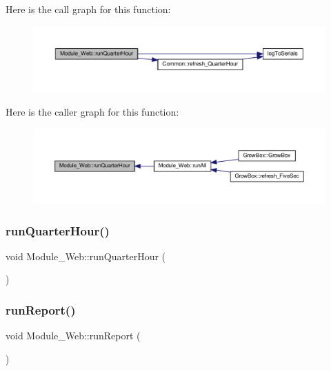 Here is the call graph for this function\+:
\nopagebreak
\begin{figure}[H]
\begin{center}
\leavevmode
\includegraphics[width=350pt]{class_module___web_a89d99a5091a144203cc705deda0c0426_cgraph}
\end{center}
\end{figure}
Here is the caller graph for this function\+:
\nopagebreak
\begin{figure}[H]
\begin{center}
\leavevmode
\includegraphics[width=350pt]{class_module___web_a89d99a5091a144203cc705deda0c0426_icgraph}
\end{center}
\end{figure}
\mbox{\label{class_module___web_a89d99a5091a144203cc705deda0c0426}} 
\subsubsection{\texorpdfstring{run\+Quarter\+Hour()}{runQuarterHour()}\hspace{0.1cm}{\footnotesize\ttfamily [2/2]}}
{\footnotesize\ttfamily void Module\+\_\+\+Web\+::run\+Quarter\+Hour (\begin{DoxyParamCaption}{ }\end{DoxyParamCaption})}

\mbox{\label{class_module___web_a32622fc4e87a9885319c73c5b4802cc5}} 
\subsubsection{\texorpdfstring{run\+Report()}{runReport()}\hspace{0.1cm}{\footnotesize\ttfamily [1/2]}}
{\footnotesize\ttfamily void Module\+\_\+\+Web\+::run\+Report (\begin{DoxyParamCaption}{ }\end{DoxyParamCaption})}

